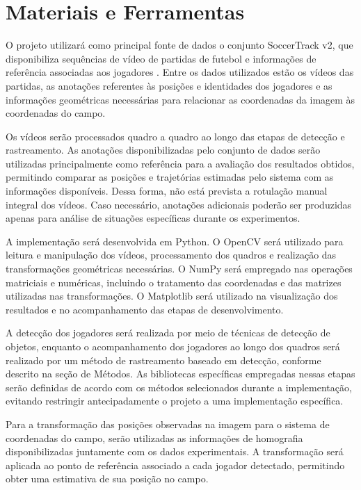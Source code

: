 \section{Materiais e Ferramentas}

O projeto utilizará como principal fonte de dados o conjunto SoccerTrack v2, que disponibiliza sequências de vídeo de partidas de futebol e informações de referência associadas aos jogadores \cite{scott2025soccertrackv2}. Entre os dados utilizados estão os vídeos das partidas, as anotações referentes às posições e identidades dos jogadores e as informações geométricas necessárias para relacionar as coordenadas da imagem às coordenadas do campo.

Os vídeos serão processados quadro a quadro ao longo das etapas de detecção e rastreamento. As anotações disponibilizadas pelo conjunto de dados serão utilizadas principalmente como referência para a avaliação dos resultados obtidos, permitindo comparar as posições e trajetórias estimadas pelo sistema com as informações disponíveis. Dessa forma, não está prevista a rotulação manual integral dos vídeos. Caso necessário, anotações adicionais poderão ser produzidas apenas para análise de situações específicas durante os experimentos.

A implementação será desenvolvida em Python. O OpenCV será utilizado para leitura e manipulação dos vídeos, processamento dos quadros e realização das transformações geométricas necessárias. O NumPy será empregado nas operações matriciais e numéricas, incluindo o tratamento das coordenadas e das matrizes utilizadas nas transformações. O Matplotlib será utilizado na visualização dos resultados e no acompanhamento das etapas de desenvolvimento.

A detecção dos jogadores será realizada por meio de técnicas de detecção de objetos, enquanto o acompanhamento dos jogadores ao longo dos quadros será realizado por um método de rastreamento baseado em detecção, conforme descrito na seção de Métodos. As bibliotecas específicas empregadas nessas etapas serão definidas de acordo com os métodos selecionados durante a implementação, evitando restringir antecipadamente o projeto a uma implementação específica.

Para a transformação das posições observadas na imagem para o sistema de coordenadas do campo, serão utilizadas as informações de homografia disponibilizadas juntamente com os dados experimentais. A transformação será aplicada ao ponto de referência associado a cada jogador detectado, permitindo obter uma estimativa de sua posição no campo.

